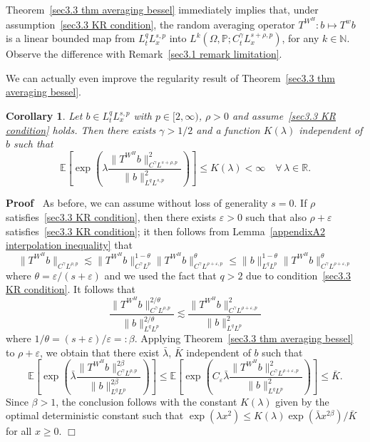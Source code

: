 \documentclass[10pt]{article}
\newcommand{\backassign}{=:}
\newenvironment{proof}{\noindent\textbf{Proof\ }}{\hspace*{\fill}$\Box$\medskip}
\newtheorem{corollary}{Corollary}
\begin{document}
\begin{remark}
  Theorem~\ref{sec3.3 thm averaging bessel} immediately implies that, under
  assumption~{\eqref{sec3.3 KR condition}}, the random averaging operator
  $T^{W^H} : b \mapsto T^w b$ is a linear bounded map from $L^q_t L^{s, p}_x$
  into $L^k (\Omega, \mathbb{P}; C^{\gamma}_t L^{s + \rho, p}_x)$, for any $k
  \in \mathbb{N}$. Observe the difference with Remark~\ref{sec3.1 remark
  limitation}.
\end{remark}

We can actually even improve the regularity result of Theorem~\ref{sec3.3 thm
averaging bessel}.

\begin{corollary}
  \label{sec3.3 corollary improvement}Let $b \in L^q_t L^{s, p}_x$ with $p \in
  [2, \infty)$, $\rho > 0$ and assume~{\eqref{sec3.3 KR condition}} holds.
  Then there exists $\gamma > 1 / 2$ and a function $K (\lambda)$ independent
  of $b$ such that
  \[ \mathbb{E} \left[ \exp \left( \lambda \frac{\| T^{W^H} b \|^2_{C^{\gamma}
     L^{s + \rho, p}}}{\| b \|_{L^q L^{s, p}}^2} \right) \right] \leqslant K
     (\lambda) < \infty \quad \forall \, \lambda \in \mathbb{R}. \]
\end{corollary}

\begin{proof}
  As before, we can assume without loss of generality $s = 0$. If $\rho$
  satisfies~{\eqref{sec3.3 KR condition}}, then there exists $\varepsilon > 0$
  such that also $\rho + \varepsilon$ satisfies~{\eqref{sec3.3 KR condition}};
  it then follows from Lemma~\ref{appendixA2 interpolation inequality} that
  \[ \| T^{W^H} b \|_{C^{\gamma} L^{\rho, p}} \lesssim \| T^{W^H} b
     \|_{C^{\gamma} L^p}^{1 - \theta} \| T^{W^H} b \|_{C^{\gamma} L^{\rho +
     \varepsilon, p}}^{\theta} \leqslant \| b \|_{L^q L^p}^{1 - \theta} \|
     T^{W^H} b \|_{C^{\gamma} L^{\rho + \varepsilon, p}}^{\theta} \]
  where $\theta = \varepsilon / (s + \varepsilon)$ and we used the fact that
  $q > 2$ due to condition~{\eqref{sec3.3 KR condition}}. It follows that
  \[ \frac{\| T^{W^H} b \|^{2 / \theta}_{C^{\gamma} L^{\rho, p}}}{\| b \|^{2 /
     \theta}_{L^q L^p}} \lesssim \frac{\| T^{W^H} b \|^2_{C^{\gamma} L^{\rho +
     \varepsilon, p}}}{\| b \|^2_{L^q L^p}} \]
  where $1 / \theta = (s + \varepsilon) / \varepsilon \backassign \beta$.
  Applying Theorem~\ref{sec3.3 thm averaging bessel} to $\rho + \varepsilon$,
  we obtain that there exist $\bar{\lambda}$, $\bar{K}$ independent of $b$
  such that
  \[ \mathbb{E} \left[ \exp \left( \bar{\lambda}  \frac{\| T^{W^H} b \|^{2
     \beta}_{C^{\gamma} L^{\rho, p}}}{\| b \|_{L^q L^p}^{2 \beta}} \right)
     \right] \leqslant \mathbb{E} \left[ \exp \left( C_{\varepsilon} 
     \bar{\lambda}  \frac{\| T^{W^H} b \|^2_{C^{\gamma} L^{\rho + \varepsilon,
     p}}}{\| b \|_{L^q L^p}^2} \right) \right] \leqslant \bar{K} . \]
  Since $\beta > 1$, the conclusion follows with the constant $K (\lambda)$
  given by the optimal deterministic constant such that $\exp (\lambda x^2)
  \leqslant K (\lambda) \exp (\bar{\lambda} x^{2 \beta}) / \bar{K}$ for all $x
  \geqslant 0$.
\end{proof}
\end{document}
